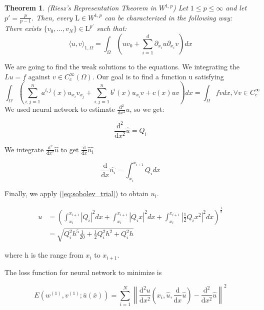 \documentclass{article}
\newtheorem{theorem}{Theorem}[section]
\begin{document}
\begin{theorem}
	(Riesz's Representation Theorem in $W^{1,p}$) Let $1 \leq p \leq \infty$ and let $p'=\frac{p}{p-1}$. Then, every $\mathrm{L} \in W^{1,p}$ can be characterized in the following way:\\
	There exists $\{v_0, \dots, v_N\} \in \mathrm{L}^{p'}$ such that:
	\[\langle u,v\rangle_{1,\Omega} = \int_{\Omega}\left(uv_{0}+\sum_{i=1}^{d}\partial_{x_i} u \partial_{x_i} v\right)dx\]
\end{theorem}

We are going to find the weak solutions to the equations. We integrating the $Lu=f$ against $v \in C_{c}^{\infty}(\Omega)$. Our goal is to find a function u satisfying
\begin{equation}
\int_{\Omega} \left(\sum_{i,j=1}^{n}a^{i,j}(x)u_{x_i}v_{x_j}+\sum_{i,j=1}^{n}b^{i}(x)u_{x_i}v + c(x)uv\right) dx = \int_{\Omega}fv dx, \forall v \in C_{c}^{\infty}
\end{equation}
 \medspace \noindent
We used neural network to estimate $\frac{\mathrm{d}^{2}}{\mathrm{d}x^{2}}u$, so we get:

\begin{equation}
\frac{\mathrm{d}^{2}}{\mathrm{d}x^{2}}\hat{u} = Q_{i} 
\end{equation}\label{eq:sobolev_trial}
 
 We integrate $\frac{\mathrm{d}^{2}}{\mathrm{d}x^{2}}\hat{u}$ to get $\frac{\mathrm{d}}{\mathrm{d}x}\hat{u_{i}}$
 
 \begin{equation}
\frac{\mathrm{d}}{\mathrm{d}x}\hat{u_{i}} = \int_{x_{i}}^{x_{i+1}}Q_{i} dx
 \end{equation}
 
 Finally, we apply (\ref{eq:sobolev_trial}) to obtain $u_{i}$. 	
 
 \begin{equation}
 \begin{aligned}
 u &= \left(\int_{x_{i}}^{x_{i+1}} \left|Q_{i} \right|^{2} dx+\int_{x_{i}}^{x_{i+1}} \left|Q_{i}x \right|^{2} dx +
 \int_{x_{i}}^{x_{i+1}} \left|\frac{1}{2}Q_{i}x^{2} \right|^{2} dx
  \right)^{\frac{1}{2}} \\
 &=\sqrt{Q_{i} ^{2}h^{5}\frac{1}{20} + \frac{1}{2}Q_{i}^{2}h^{2} + Q_{i}^{2}h}
\end{aligned}
 \end{equation}

where h is the range from $x_{i}$ to $x_{i+1}$. 

The loss function for neural network to minimize is 

\begin{equation}
E(w^{(1)},v^{(1)};\bar{u}(\bar{x})) = \sum_{i=1}^{N}\left \|  \frac{\mathrm{d}^{2}u}{\mathrm{d}x^{2}}\left(x_{i},\hat{u},\frac{\mathrm{d}}{\mathrm{d}x}\hat{u}\right)- \frac{\mathrm{d}^{2}}{\mathrm{d}x^{2}}\hat{u} \right\|^{2}
\end{equation}

	
	
	
	

	
	
	
\end{document}
